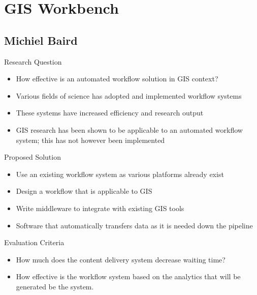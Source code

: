 \documentclass{beamer}
\begin{document}
\section{GIS Workbench}
\subsection{Michiel Baird}
\begin{frame}{Research Question}

\begin{itemize}
\item How effective is an automated workflow solution in GIS context?
\end{itemize}
\end{frame}



\begin{frame}{}
\begin{itemize}
\item Various fields of science has adopted and implemented
  workflow systems
\item These systems have increased efficiency and research output
\item GIS research has been shown to be applicable to an automated
  workflow system; this has not however been implemented
\end{itemize}
\end{frame}


\begin{frame}{Proposed Solution}

\begin{itemize}
\item Use an existing workflow system as various platforms already
  exist
\item Design a workflow that is applicable to GIS
\item Write middleware to integrate with existing GIS tools
\item Software that automatically transfers data as it is needed down
  the pipeline
\end{itemize}
\end{frame}


\begin{frame}{Evaluation Criteria}
\begin{itemize}
\item How much does the content delivery system decrease waiting time?
\item How effective is the workflow system based on the analytics that
  will be generated be the system.
\end{itemize}
\end{frame}
\end{document}
